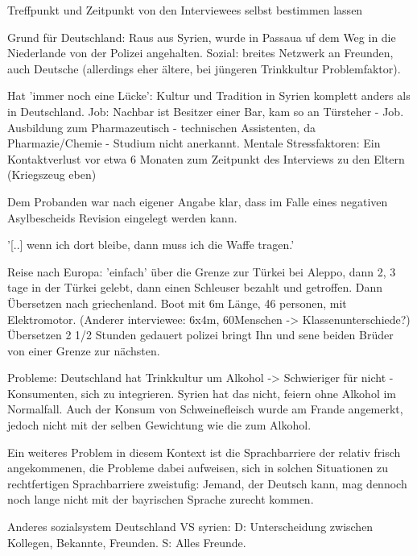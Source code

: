 Treffpunkt und Zeitpunkt von den Interviewees selbst bestimmen lassen






Grund für Deutschland: Raus aus Syrien, wurde in Passaua uf dem Weg in die Niederlande von der Polizei angehalten.
Sozial: breites Netzwerk an Freunden, auch Deutsche (allerdings eher ältere, bei jüngeren Trinkkultur Problemfaktor).

Hat 'immer noch eine Lücke': Kultur und Tradition in Syrien komplett anders als in Deutschland.
Job: Nachbar ist Besitzer einer Bar, kam so an Türsteher - Job.
Ausbildung zum Pharmazeutisch - technischen Assistenten, da Pharmazie/Chemie - Studium nicht anerkannt.
Mentale Stressfaktoren:
Ein Kontaktverlust vor etwa 6 Monaten zum Zeitpunkt des Interviews zu den Eltern (Kriegszeug eben)

Dem Probanden war nach eigener Angabe klar, dass im Falle eines negativen Asylbescheids Revision eingelegt werden kann.

'[..] wenn ich dort bleibe, dann muss ich die Waffe tragen.'

Reise nach Europa: 'einfach' über die Grenze zur Türkei bei Aleppo, dann 2, 3 tage in der Türkei gelebt, dann einen Schleuser bezahlt und getroffen. Dann Übersetzen nach griechenland. Boot mit 6m Länge, 46 personen, mit Elektromotor. (Anderer interviewee: 6x4m, 60Menschen -> Klassenunterschiede?)
Übersetzen 2 1/2 Stunden gedauert
polizei bringt Ihn und sene beiden Brüder von einer Grenze zur nächsten. 


Probleme: 
    Deutschland hat Trinkkultur um Alkohol -> Schwieriger für nicht - Konsumenten, sich zu integrieren. Syrien hat das nicht, feiern ohne Alkohol im Normalfall.
    Auch der Konsum von Schweinefleisch wurde am Frande angemerkt, jedoch nicht mit der selben Gewichtung wie die zum Alkohol.
    
    Ein weiteres Problem in diesem Kontext ist die Sprachbarriere der relativ frisch angekommenen, die Probleme dabei aufweisen, sich in solchen Situationen zu rechtfertigen
    Sprachbarriere zweistufig: Jemand, der Deutsch kann, mag dennoch noch lange nicht mit der bayrischen Sprache zurecht kommen.
    
    Anderes sozialsystem Deutschland VS syrien: 
        D: Unterscheidung zwischen Kollegen, Bekannte, Freunden.
        S: Alles Freunde.
        

